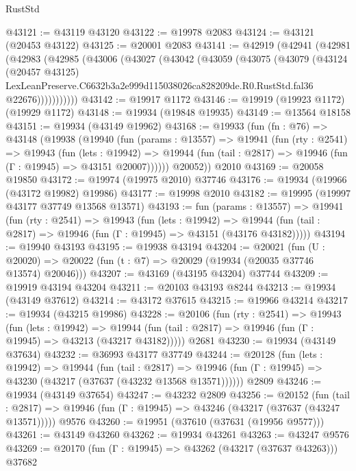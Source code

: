 \begin{lexlean}{RustStd}
\begin{coremodule}
@43121 := @43119 @43120
@43122 := @19978 @2083
@43124 := @43121 (@20453 @43122)
@43125 := @20001 @2083
@43141 := @42919
    (@42941
      (@42981
        (@42983
          (@42985
            (@43006
              (@43027
                (@43042
                  (@43059
                    (@43075
                      (@43079
                        (@43124
                          (@20457 @43125)
                          LexLeanPreserve.C6632b3a2e999d115038026ca828209de.R0.RustStd.fal36
                          @22676)))))))))))
@43142 := @19917 @1172
@43146 := @19919 (@19923 @1172) (@19929 @1172)
@43148 := @19934 (@19848 @19935)
@43149 := @13564 @18158
@43151 := @19934 (@43149 @19962)
@43168 := @19933
    (fun (fn : @76) =>
    @43148
      (@19938
        (@19940
          (fun (params : @13557) =>
          @19941
            (fun (rty : @2541) =>
            @19943
              (fun (lets : @19942) =>
              @19944 (fun (tail : @2817) => @19946 (fun (Γ : @19945) => @43151 @20007))))))
        @20052))
    @2010
@43169 := @20058 @19850
@43172 := @19974 (@19975 @2010) @37746
@43176 := @19934 (@19966 (@43172 @19982) @19986)
@43177 := @19998 @2010
@43182 := @19995 (@19997 @43177 @37749 @13568 @13571)
@43193 := fun (params : @13557) =>
  @19941
    (fun (rty : @2541) =>
    @19943
      (fun (lets : @19942) =>
      @19944 (fun (tail : @2817) => @19946 (fun (Γ : @19945) => @43151 (@43176 @43182)))))
@43194 := @19940 @43193
@43195 := @19938 @43194
@43204 := @20021
    (fun (U : @20020) => @20022 (fun (t : @7) => @20029 (@19934 (@20035 @37746 @13574) @20046)))
@43207 := @43169 (@43195 @43204) @37744
@43209 := @19919 @43194 @43204
@43211 := @20103 @43193 @8244
@43213 := @19934 (@43149 @37612)
@43214 := @43172 @37615
@43215 := @19966 @43214
@43217 := @19934 (@43215 @19986)
@43228 := @20106
    (fun (rty : @2541) =>
    @19943
      (fun (lets : @19942) =>
      @19944 (fun (tail : @2817) => @19946 (fun (Γ : @19945) => @43213 (@43217 @43182)))))
    @2681
@43230 := @19934 (@43149 @37634)
@43232 := @36993 @43177 @37749
@43244 := @20128
    (fun (lets : @19942) =>
    @19944
      (fun (tail : @2817) =>
      @19946 (fun (Γ : @19945) => @43230 (@43217 (@37637 (@43232 @13568 @13571))))))
    @2809
@43246 := @19934 (@43149 @37654)
@43247 := @43232 @2809
@43256 := @20152
    (fun (tail : @2817) => @19946 (fun (Γ : @19945) => @43246 (@43217 (@37637 (@43247 @13571)))))
    @9576
@43260 := @19951 (@37610 (@37631 (@19956 @9577)))
@43261 := @43149 @43260
@43262 := @19934 @43261
@43263 := @43247 @9576
@43269 := @20170 (fun (Γ : @19945) => @43262 (@43217 (@37637 @43263))) @37682

\end{coremodule}
\end{lexlean}

